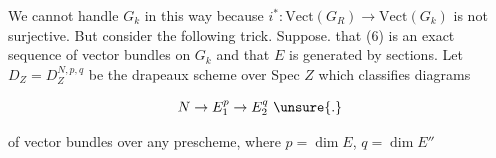 We cannot handle $G_k$ in this way because $i^*:\mathrm{Vect}(G_R) \rightarrow \mathrm{Vect}(G_k)$
is not surjective. But consider the following trick. Suppose.
that (6) is an exact sequence of vector bundles on $G_k$ and that
$E$ is generated by sections. Let $D_Z = D_Z^{N,p,q}$ be the drapeaux
scheme over Spec $Z$ which classifies diagrams

\[
N \rightarrow E_1^p \rightarrow E_2^q\ \unsure{.}
\]

of vector bundles over any prescheme, where $p = \dim E$, $q = \dim E''$


